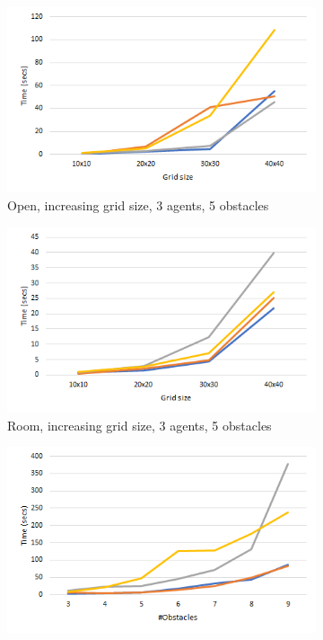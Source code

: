 \documentclass[letterpaper]{article} %
\begin{document}
\begin{figure}[t]
    \centering
    \begin{subfigure}[b]{0.2\textwidth}
      \includegraphics[scale=.27]{Figures/GridSizeOpen.png}
      \caption{Open, increasing grid size, 3 agents, 5 obstacles}
      \label{fig:GridSizeOpen}
    \end{subfigure}
    \begin{subfigure}[b]{0.2\textwidth}
      \includegraphics[scale=.27]{Figures/GridSizeRoom.png}
      \caption{Room, increasing grid size, 3 agents, 5 obstacles}
      \label{fig:GridSizeRoom}
    \end{subfigure}
    \begin{subfigure}[b]{0.2\textwidth}
      \includegraphics[scale=.27]{Figures/ObstaclesTimeOpen32.png}

\end{subfigure}
\end{figure}
\end{document}
